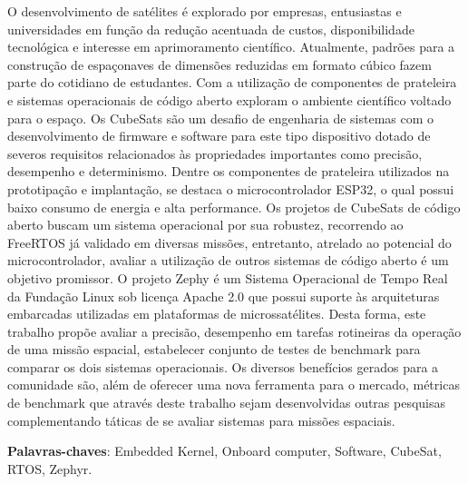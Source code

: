 \setlength{\absparsep}{18pt} %
\begin{resumo}
	O desenvolvimento de satélites é explorado por empresas, entusiastas e universidades em função da 
	redução acentuada de custos, disponibilidade tecnológica e interesse em aprimoramento científico. 
	Atualmente, padrões para a construção de espaçonaves de dimensões reduzidas em formato cúbico fazem 
	parte do cotidiano de estudantes. Com a utilização de componentes de prateleira e sistemas 
	operacionais de código aberto exploram o ambiente científico voltado para o espaço. Os CubeSats são 
	um desafio de engenharia de sistemas com o desenvolvimento de firmware e software para este tipo 
	dispositivo dotado de severos requisitos relacionados às propriedades importantes como precisão, 
	desempenho e determinismo. Dentre os componentes de prateleira utilizados na prototipação e implantação, 
	se destaca o microcontrolador ESP32, o qual possui baixo consumo de energia e alta performance. 
	Os projetos de CubeSats de código aberto buscam um sistema operacional por sua robustez, recorrendo ao 
	FreeRTOS já validado em diversas missões, entretanto, atrelado ao potencial 
	do microcontrolador, avaliar a utilização de outros sistemas de código aberto é um objetivo promissor. 
	O projeto Zephy é um Sistema Operacional de Tempo Real da Fundação Linux sob licença Apache 2.0 que possui 
	suporte às arquiteturas embarcadas utilizadas em plataformas de microssatélites. Desta forma, este trabalho 
	propõe avaliar a precisão, desempenho em tarefas rotineiras da operação de uma missão espacial, estabelecer 
	conjunto de testes de benchmark para comparar os dois sistemas operacionais. Os diversos benefícios gerados
	para a comunidade são, além de oferecer uma nova ferramenta para o mercado, métricas de benchmark que
	através deste trabalho sejam desenvolvidas outras pesquisas complementando táticas de se avaliar sistemas 
	para missões espaciais.



	\textbf{Palavras-chaves}: Embedded Kernel, Onboard computer, Software, CubeSat, RTOS, Zephyr.
\end{resumo}

